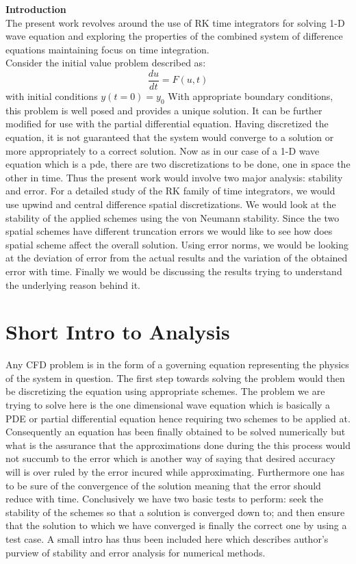 \documentclass[a4paper,12pt]{report}
\begin{document}
\newpage
\tableofcontents 
\newpage
\textbf{\huge{Introduction}}\\[2cm]
The present work revolves around the use of RK time integrators for solving 1-D wave equation and exploring the properties of the combined system of difference equations maintaining focus on time integration.\\
Consider the initial value problem described as:
\[\frac{du}{dt} =  F(u,t)\] with initial conditions $y(t=0) = y_0$
With appropriate boundary conditions, this problem is well posed and provides a unique solution. It can be further modified for use with the partial differential equation. Having discretized the equation, it is not guaranteed that the system would converge to a solution or more appropriately to a correct solution. Now as in our case of a 1-D wave equation which is a pde, there are two discretizations to be done, one in space the other in time. Thus the present work would involve two major analysis: stability and error. For a detailed study of the RK family of time integrators, we would use upwind and central difference spatial discretizations. We would look at the stability of the applied schemes using the von Neumann stability. Since the two spatial schemes have different truncation errors we would like to see how does spatial scheme affect the overall solution. Using error norms, we would be looking at the deviation of error from the actual results and the variation of the obtained error with time. Finally we would be discussing the results trying to understand the underlying reason behind it. 
\chapter{Short Intro to Analysis}
Any CFD problem is in the form of a governing equation representing the physics of the system in question. The first step towards solving the problem would then be discretizing the equation using appropriate schemes. The problem we are trying to solve here is the one dimensional wave equation which is basically a PDE or partial differential equation hence requiring two schemes to be applied at. Consequently an equation has been finally obtained to be solved numerically but what is the assurance that the approximations done during the this process would not succumb to the error which is another way of saying that desired accuracy will is over ruled by the error incured while approximating. Furthermore one has to be sure of the convergence of the solution meaning that the error should reduce with time. Conclusively we have two basic tests to perform: seek the stability of the schemes so that a solution is converged down to; and then ensure that the solution to which we have converged is finally the correct one by using a test case. A small intro has thus been included here which describes author's purview of stability and error analysis for numerical methods.
\end{document}
